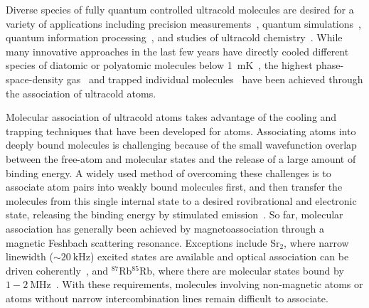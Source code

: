 \documentclass[aps,prl,twocolumn,10pt,superscriptaddress]{revtex4-1}
\begin{document}
Diverse species of fully quantum controlled  ultracold molecules are desired
for a variety of applications including precision measurements~\cite{
  Kondov2019,Nick_and_Ivan2017, PhysRevA.101.042504, Andreev2018,
  PhysRevLett.119.153001, hudson2011},
quantum simulations~\cite{Micheli2006, Yao2018, Wall2015, wall2015realizing},
quantum information processing~\cite{DeMille2002, Ni2018, Hudson2018, Lin2019},
and studies of ultracold chemistry~\cite{Bala2016,Hu1111,Segev2019,deJongh626}.
While many innovative approaches in the last few years
have directly cooled different species of diatomic or polyatomic molecules
below 1~mK~\cite{Norrgard2016,Anderegg2018, Mitra1366, PhysRevX.10.021049,
  PhysRevLett.121.013202, Truppe2017},
the highest phase-space-density gas~\cite{Demarco2018} and
trapped individual molecules~\cite{Zhang2020,He331}
have been achieved through the association of ultracold atoms.

Molecular association of ultracold atoms takes advantage of the cooling and trapping techniques
that have been developed for atoms.
Associating atoms into deeply bound molecules is challenging
because of the small wavefunction overlap between the free-atom and molecular states
and the release of a large amount of binding energy.
A widely used method of overcoming these challenges is to associate atom pairs
into weakly bound molecules first,
and then transfer the molecules from this single internal state
to a desired rovibrational and electronic state,
releasing the binding energy by stimulated emission~\cite{Danzl2008, Ni2008, Lang2008,
  Takekoshi2014, Molony2014, Park2015, Guo2016, Kondov2019, Voges2020}.
So far, molecular association has generally been achieved by magnetoassociation
through a magnetic Feshbach scattering resonance.
Exceptions include Sr$_2$, where narrow linewidth ($\sim 20~\mathrm{kHz}$) excited states
are available and optical association can be driven coherently~\cite{Reinaudi2012,Stellmer2012},
and $^{87}$Rb$^{85}$Rb,
where there are molecular states bound by $1-2~\mathrm{MHz}$~\cite{He331}.
With these requirements, molecules involving non-magnetic atoms
or atoms without narrow intercombination lines remain difficult to associate.
\end{document}
